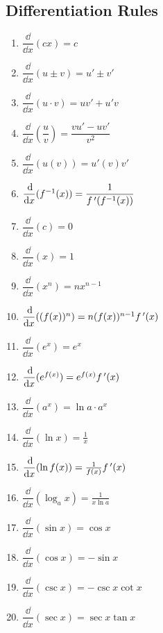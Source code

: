

\subsection{Differentiation Rules}

\bgroup
\footnotesize
\renewcommand{\arraystretch}{2.5}%
\setlength{\columnsep}{6pt}%
\noindent{}%
\hspace{-1.5em}%
\parbox{.29\linewidth}{%
\begin{enumerate}
\item $\dfrac\dd{\dd x}(cx)=c$
\item $\dfrac\dd{\dd x}(u\pm v)=u'\pm v'$
\item $\dfrac\dd{\dd x}(u\cdot v)=uv'+u'v$%
\item $\dfrac\dd{\dd x}\left(\dfrac uv\right)=\dfrac{vu'-uv'}{v^2}$
\item $\dfrac\dd{\dd x}(u(v))=u'(v)v'$
\item $\dfrac{\operatorname{d}\!}{\operatorname{d}\! x}(f^{-1}(x))=\dfrac1{f\,'(f^{-1}(x))}$
\item $\dfrac\dd{\dd x}(c)=0$
\item $\dfrac\dd{\dd x}(x)=1$
\item $\dfrac\dd{\dd x}(x^n)=nx^{n-1}$
\item $\dfrac{\operatorname{d}\!}{\operatorname{d}\! x}((f(x))^n)=n(f(x))^{n-1}f\,'(x)$
\end{enumerate}}\hfill
\parbox{.23\linewidth}{%
\begin{enumerate}\setcounter{enumi}{10}
\item $\dfrac\dd{\dd x}(e^x)=e^x$
\item $\dfrac{\operatorname{d}\!}{\operatorname{d}\! x}(e^{f(x)})=e^{f(x)}f\,'(x)$
\item $\dfrac\dd{\dd x}(a^x)=\ln a\cdot a^x$
\item $\dfrac\dd{\dd x}(\ln x)=\frac1x$
\item $\dfrac{\operatorname{d}\!}{\operatorname{d}\! x}(\ln f(x))=\frac1{f(x)}f\,'(x)$
\item $\dfrac\dd{\dd x}(\log_a x)=\frac1{x\ln a}$
\item $\dfrac\dd{\dd x}(\sin x)=\cos x$
\item $\dfrac\dd{\dd x}(\cos x)=-\sin x$
\item $\dfrac\dd{\dd x}(\csc x)=-\csc x\cot x$%
\item $\dfrac\dd{\dd x}(\sec x)=\sec x\tan x$
\end{enumerate}}\hfill
